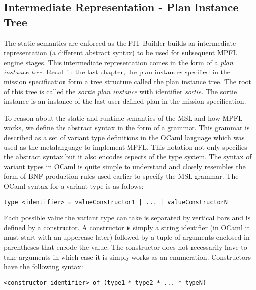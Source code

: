 \subsection{Intermediate Representation - Plan Instance Tree}
The static semantics are enforced as the PIT Builder builds an intermediate representation (a different abstract syntax) to be used for subsequent MPFL engine stages. This intermediate representation comes in the form of a \textit{plan instance tree}. Recall in the last chapter, the plan instances specified in the mission specification form a tree structure called the plan instance tree. The root of this tree is called the \emph{sortie plan instance} with identifier \emph{sortie}. The sortie instance is an instance of the last user-defined plan in the mission specification.

To reason about the static and runtime semantics of the MSL and how MPFL works, we define the abstract syntax in the form of a grammar. This grammar is described as a set of variant type definitions in the OCaml language which was used as the metalanguage to implement MPFL. This notation not only specifies the abstract syntax but it also encodes aspects of the type system. The syntax of variant types in OCaml is quite simple to understand and closely resembles the form of BNF production rules used earlier to specify the MSL grammar. The OCaml syntax for a variant type is as follows:

\begin{verbatim}
type <identifier> = valueConstructor1 | ... | valueConstructorN
\end{verbatim}

Each possible value the variant type can take is separated by vertical bars and is defined by a constructor. A constructor is simply a string identifier (in OCaml it must start with an uppercase later) followed by a tuple of arguments enclosed in parentheses that encode the value. The constructor does not necessarily have to take arguments in which case it is simply works as an enumeration.
Constructors have the following syntax:
\begin{verbatim}
<constructor identifier> of (type1 * type2 * ... * typeN)
\end{verbatim}

